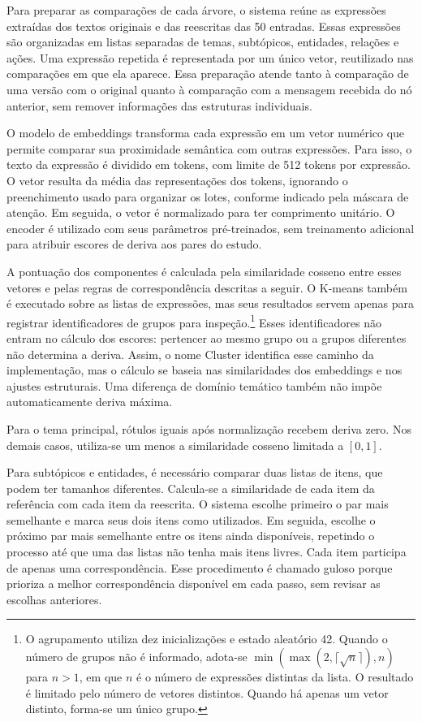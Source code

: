 Para preparar as comparações de cada árvore, o sistema reúne as expressões extraídas dos textos originais e das reescritas das 50 entradas. Essas expressões são organizadas em listas separadas de temas, subtópicos, entidades, relações e ações. Uma expressão repetida é representada por um único vetor, reutilizado nas comparações em que ela aparece. Essa preparação atende tanto à comparação de uma versão com o original quanto à comparação com a mensagem recebida do nó anterior, sem remover informações das estruturas individuais.

O modelo de embeddings transforma cada expressão em um vetor numérico que permite comparar sua proximidade semântica com outras expressões. Para isso, o texto da expressão é dividido em tokens, com limite de 512 tokens por expressão. O vetor resulta da média das representações dos tokens, ignorando o preenchimento usado para organizar os lotes, conforme indicado pela máscara de atenção. Em seguida, o vetor é normalizado para ter comprimento unitário. O encoder é utilizado com seus parâmetros pré-treinados, sem treinamento adicional para atribuir escores de deriva aos pares do estudo.

A pontuação dos componentes é calculada pela similaridade cosseno entre esses vetores e pelas regras de correspondência descritas a seguir. O K-means também é executado sobre as listas de expressões, mas seus resultados servem apenas para registrar identificadores de grupos para inspeção.\footnote{O agrupamento utiliza dez inicializações e estado aleatório 42. Quando o número de grupos não é informado, adota-se $\min(\max(2,\lceil\sqrt{n}\rceil),n)$ para $n>1$, em que $n$ é o número de expressões distintas da lista. O resultado é limitado pelo número de vetores distintos. Quando há apenas um vetor distinto, forma-se um único grupo.} Esses identificadores não entram no cálculo dos escores: pertencer ao mesmo grupo ou a grupos diferentes não determina a deriva. Assim, o nome Cluster identifica esse caminho da implementação, mas o cálculo se baseia nas similaridades dos embeddings e nos ajustes estruturais. Uma diferença de domínio temático também não impõe automaticamente deriva máxima.

Para o tema principal, rótulos iguais após normalização recebem deriva zero. Nos demais casos, utiliza-se um menos a similaridade cosseno limitada a $[0,1]$.

Para subtópicos e entidades, é necessário comparar duas listas de itens, que podem ter tamanhos diferentes. Calcula-se a similaridade de cada item da referência com cada item da reescrita. O sistema escolhe primeiro o par mais semelhante e marca seus dois itens como utilizados. Em seguida, escolhe o próximo par mais semelhante entre os itens ainda disponíveis, repetindo o processo até que uma das listas não tenha mais itens livres. Cada item participa de apenas uma correspondência. Esse procedimento é chamado guloso porque prioriza a melhor correspondência disponível em cada passo, sem revisar as escolhas anteriores.

